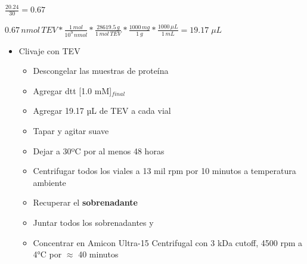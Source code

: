 \begin{appendix}
$
\frac{20.24}{30} = 0.67
$

$
0.67\, nmol \,TEV*\frac{1 \,mol}{10^9 \,nmol}*\frac{28619.5 \,g}{1 \,mol\, TEV}*\frac{1000 \,mg}{1 \,g}*\frac{1000\, \mu L}{1\, mL} = 19.17 \; \mu L 
$
\begin{itemize}
    \item{Clivaje con TEV}
    \begin{itemize}
        \item{Descongelar las muestras de proteína}
        \item{Agregar \ac{dtt} [1.0 mM]$_{final}$}
        \item{Agregar 19.17 µL de TEV a cada vial}
        \item{Tapar y agitar suave}
        \item{Dejar a 30ºC por al menos 48 horas}
        \item{Centrifugar todos los viales a 13 mil \ac{rpm} por 10 minutos a temperatura ambiente}
        \item{Recuperar el \textbf{sobrenadante}}
        \item{Juntar todos los sobrenadantes y }
        \item{Concentrar en   Amicon Ultra-15 Centrifugal con 3 kDa  cutoff, 4500 \ac{rpm} a 4°C por $\approx$ 40 minutos}
    \end{itemize}


\end{itemize}
\end{appendix}

